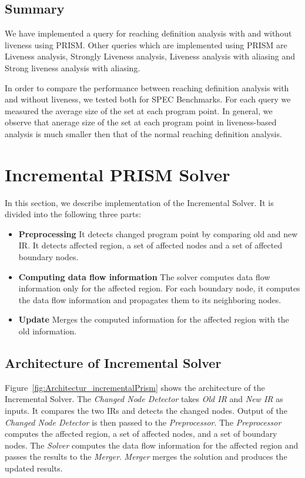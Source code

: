 \documentclass[11pt,a4paper,openright]{report}
\begin{document}
\section{Summary}
We have implemented a query for reaching definition analysis with and without liveness using PRISM. Other queries which are 
implemented using PRISM are Liveness analysis, Strongly Liveness analysis, Liveness analysis with aliasing
and Strong liveness analysis with aliasing. 

In order to compare the performance between reaching definition analysis with and without liveness, we tested both for SPEC Benchmarks.
For each query we measured the average size of the set at each program point. In general, we observe that anerage size of the set at each program 
point in liveness-based analysis is much smaller then that of the normal reaching definition analysis.


\chapter{Incremental PRISM Solver}
In this section, we describe implementation of the Incremental Solver. It is divided into the following three parts:

\begin{itemize}
\item \textbf{Preprocessing} It detects changed program point by comparing old and new IR. It detects affected region,  a set of affected nodes and a set
of affected boundary nodes.

\item \textbf{Computing data flow information}
The solver computes data flow information only for the affected region. For each boundary node, it computes the data flow information and propagates
them to its neighboring nodes.

\item \textbf{Update} Merges the computed information for the affected region with the old information.

\end{itemize}


\section{Architecture of Incremental Solver}
Figure~\ref{fig:Architectur_incrementalPrism} shows the architecture of the Incremental Solver. The \textit{Changed Node Detector}
takes \textit{Old IR} and \textit{New IR} as inputs. It compares the two IRs and detects the changed nodes. 
Output of the \textit{Changed Node Detector} is then passed to the \textit{Preprocessor}. The \textit{Preprocessor} computes 
the affected region, a set of affected nodes, and a set of boundary nodes. The \textit{Solver} computes the data flow information
for the affected region and passes the results to the \textit{Merger}. \textit{Merger} merges the solution and produces the updated results. 
\end{document}
